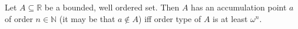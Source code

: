 
\begin{lemma}\label{accumulation_points_and_order}
Let $A \subseteq \mathbb{R}$ be a bounded, well ordered set. 
Then $A$ has an accumulation point $a$ of order 
$n \in \mathbb{N}$ (it may be that $a \notin A$) iff order type of $A$ is at least $\omega^n$. 
\end{lemma}

